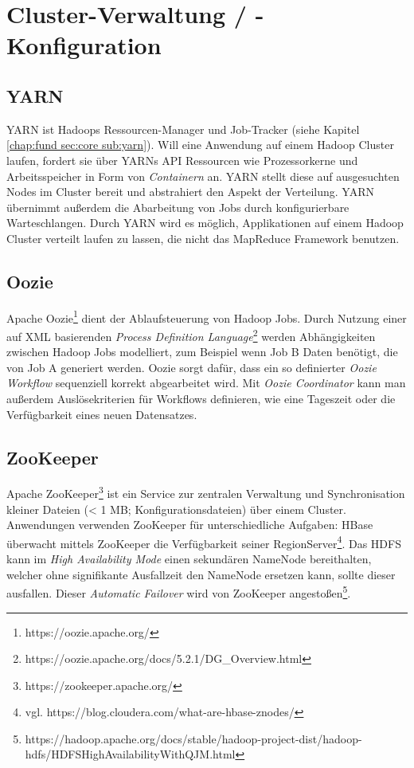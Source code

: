 \section{Cluster-Verwaltung / -Konfiguration}
\subsection{YARN}
YARN ist Hadoops Ressourcen-Manager und Job-Tracker (siehe Kapitel \ref{chap:fund sec:core sub:yarn}). Will eine Anwendung auf einem Hadoop Cluster laufen, fordert sie über YARNs API Ressourcen wie Prozessorkerne und Arbeitsspeicher in Form von \textit{Containern} an. YARN stellt diese auf ausgesuchten Nodes im Cluster bereit und abstrahiert den Aspekt der Verteilung. YARN übernimmt außerdem die Abarbeitung von Jobs durch konfigurierbare Warteschlangen. Durch YARN wird es möglich, Applikationen auf einem Hadoop Cluster verteilt laufen zu lassen, die nicht das MapReduce Framework benutzen.\parencite[vgl.][YARN $\rightarrow$ Architecture]{noauthor_apache_nodate}
\subsection{Oozie}
Apache Oozie\footnote{https://oozie.apache.org/} dient der Ablaufsteuerung von Hadoop Jobs. Durch Nutzung einer auf XML basierenden \textit{Process Definition Language}\footnote{https://oozie.apache.org/docs/5.2.1/DG\_Overview.html} werden Abhängigkeiten zwischen Hadoop Jobs modelliert, zum Beispiel wenn Job B Daten benötigt, die von Job A generiert werden. Oozie sorgt dafür, dass ein so definierter \textit{Oozie Workflow} sequenziell korrekt abgearbeitet wird. Mit \textit{Oozie Coordinator} kann man außerdem Auslösekriterien für Workflows definieren, wie eine Tageszeit oder die Verfügbarkeit eines neuen Datensatzes. 
\subsection{ZooKeeper}
Apache ZooKeeper\footnote{https://zookeeper.apache.org/} ist ein Service zur zentralen Verwaltung und Synchronisation kleiner Dateien (< 1 MB; Konfigurationsdateien) über einem Cluster. Anwendungen verwenden ZooKeeper für unterschiedliche Aufgaben: HBase überwacht mittels ZooKeeper die Verfügbarkeit seiner RegionServer\footnote{vgl. https://blog.cloudera.com/what-are-hbase-znodes/}. Das HDFS kann im \textit{High Availability Mode} einen sekundären NameNode bereithalten, welcher ohne signifikante Ausfallzeit den NameNode ersetzen kann, sollte dieser ausfallen. Dieser \textit{Automatic Failover} wird von ZooKeeper angestoßen\footnote{https://hadoop.apache.org/docs/stable/hadoop-project-dist/hadoop-hdfs/HDFSHighAvailabilityWithQJM.html}.
